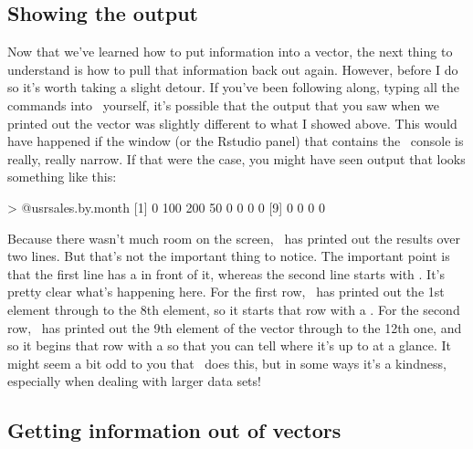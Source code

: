 \subsection{Showing the output}

Now that we've learned how to put information into a vector, the next  thing to understand is how to pull that information back out again. However, before I do so it's worth taking a slight detour. If you've been following along, typing all the commands into \R\ yourself, it's possible that the output that you saw when we printed out the  vector was slightly different to what I showed above. This would have happened if the window (or the Rstudio panel) that contains the \R\ console is really, really narrow. If that were the case, you might have seen output that looks something like this:
\begin{rblock1}
> @usr{sales.by.month}
 [1]   0 100 200  50   0   0   0   0
 [9]   0   0   0   0
\end{rblock1}
Because there wasn't much room on the screen, \R\ has printed out the results over two lines. But that's not the important thing to notice. The important point is that the first line has a \rtextoutput{[1]} in front of it, whereas the second line starts with \rtextoutput{[9]}. It's pretty clear what's happening here. For the first row, \R\ has printed out the 1st element through to the 8th element, so it starts that row with a \rtextoutput{[1]}. For the second row, \R\ has printed out the 9th element of the vector through to the 12th one, and so it begins that row with a \rtextoutput{[9]} so that you can tell where it's up to at a glance. It might seem a bit odd to you that \R\ does this, but in some ways it's a kindness, especially when dealing with larger data sets!


\subsection{Getting information out of vectors\label{sec:vectorsubset}}

